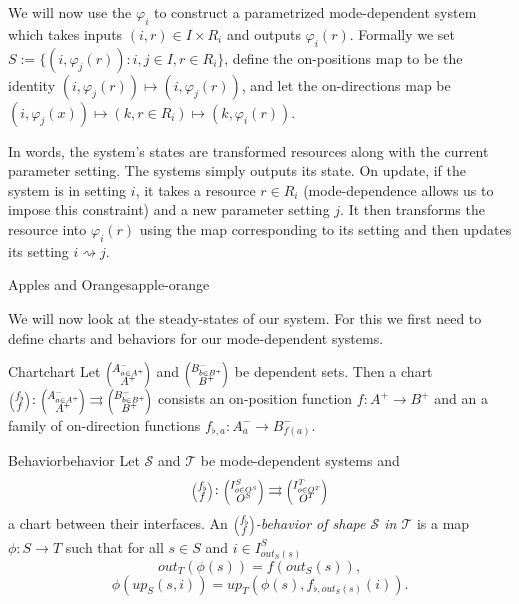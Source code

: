 \documentclass[12pt, a4paper]{article}
\theoremstyle{definition}
\theoremstyle{plain}
\theoremstyle{plain}
\theoremstyle{plain}
\theoremstyle{plain}
\theoremstyle{plain}
\theoremstyle{remark}
\theoremstyle{remark}
\newcommand{\mc}[1]{\mathcal{#1}}
\newcommand{\lens}[2]{\scaleobj{0.6}{\begin{pmatrix} \scaleobj{1.3}{{#1}} \\ \scaleobj{1.3}{{#2}} \end{pmatrix}}}
\begin{document}
We will now use the $\varphi_i$ to construct a parametrized mode-dependent system which takes inputs $(i, r) \in I \times R_i$ and outputs $\varphi_i(r)$. Formally we set $S := \{ (i,\varphi_j(r)) : i,j \in I, r \in R_i \}$, define the on-positions map to be the identity $(i,\varphi_j(r)) \mapsto (i,\varphi_j(r))$, and let the on-directions map be $(i,\varphi_j(x))\mapsto (k,r \in R_i) \mapsto (k,\varphi_i(r))$. 

In words, the system's states are transformed resources along with the current parameter setting. The systems simply outputs its state. On update, if the system is in setting $i$, it takes a resource $r \in R_i$ (mode-dependence allows us to impose this constraint) and a new parameter setting $j$. It then transforms the resource into $\varphi_i(r)$ using the map corresponding to its setting and then updates its setting $i \rightsquigarrow j$.

\begin{tcexample}{Apples and Oranges}{apple-orange}

\end{tcexample}

We will now look at the steady-states of our system. For this we first need to define charts and behaviors for our mode-dependent systems.

\begin{tcdefinition}{Chart}{chart}
	Let $\lens{A^-_{a \in A^+}}{A^+}$ and $\lens{B^-_{b \in B^+}}{B^+}$ be dependent sets. Then a chart $\lens{f_\flat}{f} \colon \lens{A^-_{a \in A^+}}{A^+} \rightrightarrows \lens{B^-_{b \in B^+}}{B^+}$ consists an on-position function $f \colon A^+ \rightarrow B^+$ and an a family of on-direction functions $f_{\flat,a} \colon A^-_a \rightarrow B^-_{f(a)}$.
\end{tcdefinition}

\begin{tcdefinition}{Behavior}{behavior}
	Let $\mc{S}$ and $\mc{T}$ be mode-dependent systems and $$\lens{f_\flat}{f} \colon \lens{I^S_{o \in O^S}}{O^S} \rightrightarrows \lens{I^T_{o \in O^T}}{O^T}$$
	a chart between their interfaces. An \emph{$\lens{f_\flat}{f}$-behavior of shape $\mc{S}$ in $\mc{T}$} is a map $\phi: S \rightarrow T$ such that for all $s \in S$ and $i \in I^S_{out_S(s)}$
	$$out_T(\phi(s)) = f(out_S(s)), $$
	$$\phi(up_S(s,i)) = up_T(\phi(s), f_{\flat,out_S(s)}(i)).$$
\end{tcdefinition}
\end{document}
